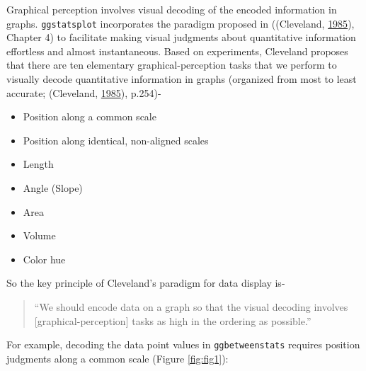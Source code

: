 \documentclass[]{article}
\providecommand{\tightlist}{%
  \setlength{\itemsep}{0pt}\setlength{\parskip}{0pt}}
\begin{document}
Graphical perception involves visual decoding of the encoded information in
graphs. \texttt{ggstatsplot} incorporates the paradigm proposed in
((Cleveland, \protect\hyperlink{ref-clevelandElementsGraphingData1985}{1985}), Chapter 4) to facilitate making visual
judgments about quantitative information effortless and almost instantaneous.
Based on experiments, Cleveland proposes that there are ten elementary
graphical-perception tasks that we perform to visually decode quantitative
information in graphs (organized from most to least accurate;
(Cleveland, \protect\hyperlink{ref-clevelandElementsGraphingData1985}{1985}), p.254)-

\begin{itemize}
\tightlist
\item
  Position along a common scale
\item
  Position along identical, non-aligned scales
\item
  Length
\item
  Angle (Slope)
\item
  Area
\item
  Volume
\item
  Color hue
\end{itemize}

So the key principle of Cleveland's paradigm for data display is-

\begin{quote}
``We should encode data on a graph so that the visual decoding involves
{[}graphical-perception{]} tasks as high in the ordering as possible.''
\end{quote}

For example, decoding the data point values in \texttt{ggbetweenstats} requires
position judgments along a common scale (Figure \ref{fig:fig1}):
\end{document}
